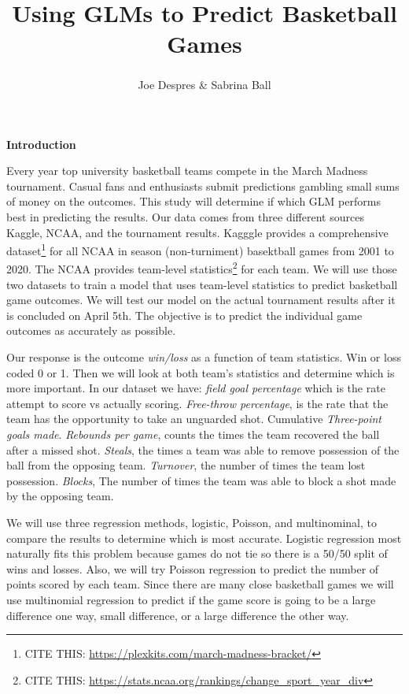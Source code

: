 \documentclass[
  english,
  man,floatsintext]{apa6}
\title{Using GLMs to Predict Basketball Games}
\author{Joe Despres\textsuperscript{} \& Sabrina Ball\textsuperscript{}}
\date{}
\affiliation{\vspace{0.5cm}\textsuperscript{} Michigan State University}
\begin{document}
\maketitle

\textbf{Introduction}

Every year top university basketball teams compete in the March Madness tournament. Casual fans and enthusiasts submit predictions gambling small sums of money on the outcomes. This study will determine if which GLM performs best in predicting the results. Our data comes from three different sources Kaggle, NCAA, and the tournament results. Kagggle provides a comprehensive dataset\footnote{CITE THIS: \url{https://plexkits.com/march-madness-bracket/}} for all NCAA in season (non-turniment) basektball games from 2001 to 2020. The NCAA provides team-level statistics\footnote{CITE THIS: \url{https://stats.ncaa.org/rankings/change_sport_year_div}} for each team. We will use those two datasets to train a model that uses team-level statistics to predict basketball game outcomes. We will test our model on the actual tournament results after it is concluded on April 5th. The objective is to predict the individual game outcomes as accurately as possible.

Our response is the outcome \emph{win/loss} as a function of team statistics. Win or loss coded 0 or 1. Then we will look at both team's statistics and determine which is more important. In our dataset we have: \emph{field goal percentage} which is the rate attempt to score vs actually scoring. \emph{Free-throw percentage}, is the rate that the team has the opportunity to take an unguarded shot. Cumulative \emph{Three-point goals made}. \emph{Rebounds per game}, counts the times the team recovered the ball after a missed shot. \emph{Steals}, the times a team was able to remove possession of the ball from the opposing team. \emph{Turnover}, the number of times the team lost possession. \emph{Blocks}, The number of times the team was able to block a shot made by the opposing team.

We will use three regression methods, logistic, Poisson, and multinominal, to compare the results to determine which is most accurate. Logistic regression most naturally fits this problem because games do not tie so there is a 50/50 split of wins and losses. Also, we will try Poisson regression to predict the number of points scored by each team. Since there are many close basketball games we will use multinomial regression to predict if the game score is going to be a large difference one way, small difference, or a large difference the other way.
\end{document}
